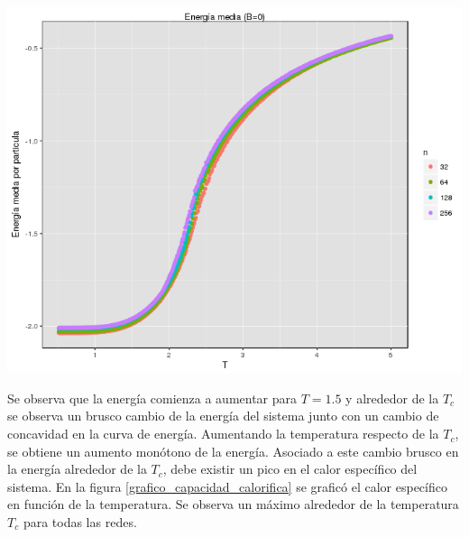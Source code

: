 \documentclass[%
 reprint,
 amsmath,amssymb,
 aps,
spanish]{revtex4-1}
\begin{document}
\begin{minipage}{0.45\textwidth}									
\centering
\includegraphics[totalheight=0.25\textheight]{imagenes/con_corona/energia.png}
\label{ref:grafico_energia}
\end{minipage}

Se observa que la energía comienza a aumentar para $T=1.5$ y alrededor de la $T_c$ se observa un brusco cambio de la energía del sistema junto con un cambio de concavidad en la curva de energía. Aumentando la temperatura respecto de la $T_c$, se obtiene un aumento monótono de
la energía. Asociado a este cambio brusco en la energía alrededor de la $T_c$, debe existir un pico en el calor
específico del sistema. En la figura \ref{grafico_capacidad_calorifica} se graficó el calor específico en función de la temperatura. Se observa un máximo alrededor de la temperatura $T_c$ para todas las redes.
\end{document}
